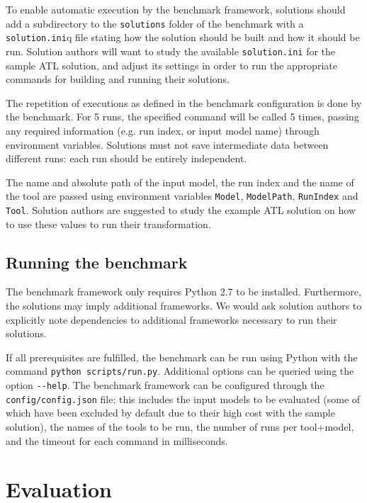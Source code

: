 \documentclass[a4paper]{scrartcl}
\newcommand*{\file}[1]{\texttt{#1}}
\begin{document}
To enable automatic execution by the benchmark framework, solutions should add a
subdirectory to the \file{solutions} folder of the benchmark with a
\file{solution.ini}q file stating how the solution should be built and how it
should be run. Solution authors will want to study the available
\file{solution.ini} for the sample ATL solution, and adjust its settings in
order to run the appropriate commands for building and running their solutions.

The repetition of executions as defined in the benchmark configuration is done
by the benchmark. For 5 runs, the specified command will be called 5 times,
passing any required information (e.g. run index, or input model name) through
environment variables. Solutions must not save intermediate data between
different runs: each run should be entirely independent.

The name and absolute path of the input model, the run index and the name of the
tool are passed using environment variables \file{Model}, \file{ModelPath},
\file{RunIndex} and \file{Tool}. Solution authors are suggested to study the
example ATL solution on how to use these values to run their transformation.

\subsection{Running the benchmark}
\label{sec:running-benchmark}

The benchmark framework only requires Python 2.7 to be installed. Furthermore,
the solutions may imply additional frameworks. We would ask solution authors to
explicitly note dependencies to additional frameworks necessary to run their
solutions.

If all prerequisites are fulfilled, the benchmark can be run using Python with
the command \file{python scripts/run.py}. Additional options can be queried
using the option \file{{-}{-}help}. The benchmark framework can be configured
through the \file{config/config.json} file: this includes the input models to be
evaluated (some of which have been excluded by default due to their high cost with the sample solution), the names of the tools to be run, the number of runs per tool+model, and the timeout for each command in milliseconds.

\section{Evaluation}
\label{sec:evaluation}
\end{document}
